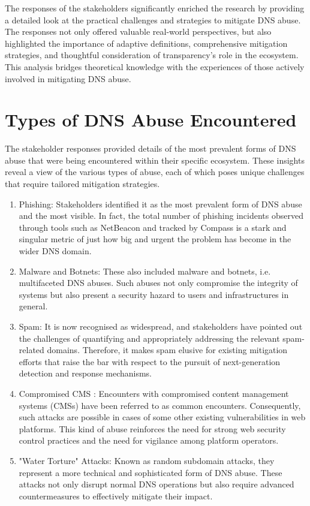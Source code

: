 The responses of the stakeholders significantly enriched the research by providing a detailed look at the practical challenges and strategies to mitigate DNS abuse. The responses not only offered valuable real-world perspectives, but also highlighted the importance of adaptive definitions, comprehensive mitigation strategies, and thoughtful consideration of transparency's role in the ecosystem. This analysis bridges theoretical knowledge with the experiences of those actively involved in mitigating DNS abuse.

\section{Types of DNS Abuse Encountered} 

The stakeholder responses provided details of the most prevalent forms of DNS abuse that were being encountered within their specific ecosystem. These insights reveal a view of the various types of abuse, each of which poses unique challenges that require tailored mitigation strategies.

\begin{enumerate}
    \item Phishing: Stakeholders identified it as the most prevalent form of DNS abuse and the most visible. In fact, the total number of phishing incidents observed through tools such as NetBeacon and tracked by Compass is a stark and singular metric of just how big and urgent the problem has become in the wider DNS domain.
    \item Malware and Botnets: These also included malware and botnets, i.e. multifaceted DNS abuses. Such abuses not only compromise the integrity of systems but also present a security hazard to users and infrastructures in general.
    \item Spam: It is now recognised as widespread, and stakeholders have pointed out the challenges of quantifying and appropriately addressing the relevant spam-related domains. Therefore, it makes spam elusive for existing mitigation efforts that raise the bar with respect to the pursuit of next-generation detection and response mechanisms.
    \item Compromised CMS : Encounters with compromised content management systems (CMSs) have been referred to as common encounters. Consequently, such attacks are possible in cases of some other existing vulnerabilities in web platforms. This kind of abuse reinforces the need for strong web security control practices and the need for vigilance among platform operators.
    \item "Water Torture" Attacks: Known as random subdomain attacks, they represent a more technical and sophisticated form of DNS abuse. These attacks not only disrupt normal DNS operations but also require advanced countermeasures to effectively mitigate their impact.
\end{enumerate}

